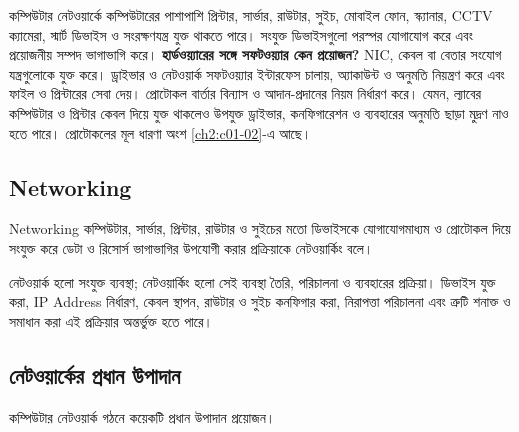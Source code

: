 কম্পিউটার নেটওয়ার্কে কম্পিউটারের পাশাপাশি প্রিন্টার, সার্ভার, রাউটার, সুইচ, মোবাইল ফোন, স্ক্যানার, CCTV ক্যামেরা, স্মার্ট ডিভাইস ও সংরক্ষণযন্ত্র যুক্ত থাকতে পারে। সংযুক্ত ডিভাইসগুলো পরস্পর যোগাযোগ করে এবং প্রয়োজনীয় সম্পদ ভাগাভাগি করে।
\textbf{হার্ডওয়্যারের সঙ্গে সফটওয়্যার কেন প্রয়োজন?} NIC, কেবল বা বেতার সংযোগ যন্ত্রগুলোকে যুক্ত করে। ড্রাইভার ও নেটওয়ার্ক সফটওয়্যার ইন্টারফেস চালায়, অ্যাকাউন্ট ও অনুমতি নিয়ন্ত্রণ করে এবং ফাইল ও প্রিন্টারের সেবা দেয়। প্রোটোকল বার্তার বিন্যাস ও আদান-প্রদানের নিয়ম নির্ধারণ করে। যেমন, ল্যাবের কম্পিউটার ও প্রিন্টার কেবল দিয়ে যুক্ত থাকলেও উপযুক্ত ড্রাইভার, কনফিগারেশন ও ব্যবহারের অনুমতি ছাড়া মুদ্রণ নাও হতে পারে। প্রোটোকলের মূল ধারণা অংশ \ref{ch2:c01-02}-এ আছে।





\subsection{Networking}

\begin{definitionbox}{Networking}
কম্পিউটার, সার্ভার, প্রিন্টার, রাউটার ও সুইচের মতো ডিভাইসকে যোগাযোগমাধ্যম ও প্রোটোকল দিয়ে সংযুক্ত করে ডেটা ও রিসোর্স ভাগাভাগির উপযোগী করার প্রক্রিয়াকে নেটওয়ার্কিং বলে।
\end{definitionbox}

নেটওয়ার্ক হলো সংযুক্ত ব্যবস্থা; নেটওয়ার্কিং হলো সেই ব্যবস্থা তৈরি, পরিচালনা ও ব্যবহারের প্রক্রিয়া। ডিভাইস যুক্ত করা, IP Address নির্ধারণ, কেবল স্থাপন, রাউটার ও সুইচ কনফিগার করা, নিরাপত্তা পরিচালনা এবং ত্রুটি শনাক্ত ও সমাধান করা এই প্রক্রিয়ার অন্তর্ভুক্ত হতে পারে।

\subsection{নেটওয়ার্কের প্রধান উপাদান}

কম্পিউটার নেটওয়ার্ক গঠনে কয়েকটি প্রধান উপাদান প্রয়োজন।

